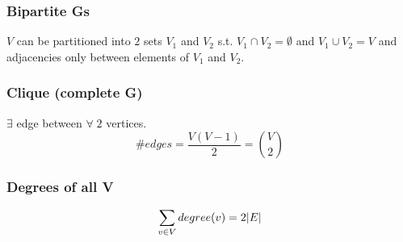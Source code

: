     \subsubsection{Bipartite Gs}
    \begin{definition}
        $V$ can be partitioned into $2$ sets $V_1$ and $V_2$ s.t. $V_1 \cap V_2 = \emptyset$ and $V_1 \cup V_2 = V$ and adjacencies only between elements of $V_1$ and $V_2$.
    \end{definition}

    \subsubsection{Clique (complete G)}
    \begin{definition}
        $\exists$ edge between $\forall \; 2$ vertices. 
        \begin{equation}
            \# edges = \frac{V(V-1)}{2} = \binom{V}{2}
        \end{equation}
    \end{definition}

    \subsubsection{Degrees of all V}
    \begin{definition}
        \begin{equation}
            \sum_{v\in V} degree(v) = 2\abs{E}
        \end{equation}
    \end{definition}

